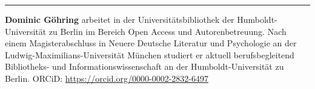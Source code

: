 \begin{center}\rule{0.5\linewidth}{0.5pt}\end{center}

\textbf{Dominic Göhring} arbeitet in der Universitätsbibliothek der Humboldt-Universität zu Berlin im Bereich Open Access und Autorenbetreuung. Nach einem Magisterabschluss in Neuere Deutsche Literatur und Psychologie an der Ludwig-Maximilians-Universität München studiert er aktuell berufsbegleitend Bibliotheks- und Informationswissenschaft an der Humboldt-Universität zu Berlin. ORCiD: \url{https://orcid.org/0000-0002-2832-6497}
